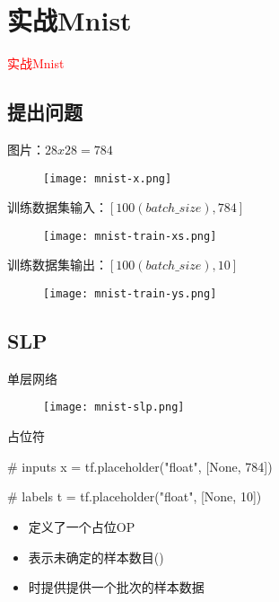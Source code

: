 \section{实战Mnist}
\label{sec:mnist}

\begin{frame}
  \begin{center}
    \Huge{\textcolor{red}{实战Mnist}}
  \end{center}
\end{frame}

\subsection{提出问题}

\begin{frame}{图片：$ 28x28 = 784 $}
  \begin{figure}
    \centering
    \texttt{[image: mnist-x.png]}
  \end{figure}
\end{frame}

\begin{frame}{训练数据集输入：$ [100(batch\_size), 784] $}
  \begin{figure}
    \centering
    \texttt{[image: mnist-train-xs.png]}
  \end{figure}
\end{frame}

\begin{frame}{训练数据集输出：$ [100(batch\_size), 10] $}
  \begin{figure}
    \centering
    \texttt{[image: mnist-train-ys.png]}
  \end{figure}
\end{frame}

\subsection{SLP}

\begin{frame}{单层网络}
  \begin{figure}
    \centering
    \texttt{[image: mnist-slp.png]}
  \end{figure}
\end{frame}

\begin{frame}[fragile]{占位符}
\begin{python}
# inputs
x  = tf.placeholder("float", [None, 784])  

# labels
t = tf.placeholder("float", [None, 10])
\end{python}

\begin{itemize}
  \item {}定义了一个占位OP
  \item {}表示未确定的样本数目()
  \item {}时提供提供一个批次的样本数据
\end{itemize}
\end{frame}

